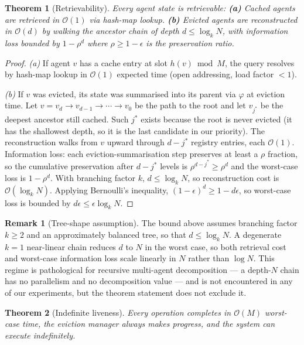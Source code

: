 \documentclass[fleqn,10pt]{article}
\newtheorem{theorem}{Theorem}
\theoremstyle{definition}
\newtheorem{remark}{Remark}
\newcommand{\summarize}{\varphi}
\newcommand{\preserv}{\rho}
\newcommand{\Oh}{\mathcal{O}}
\newcommand{\slots}{M}
\begin{document}
\begin{theorem}[Retrievability]
\label{thm:retrieve}
Every agent state is retrievable:
\textbf{(a)} Cached agents are retrieved in $\Oh(1)$ via hash-map
lookup.
\textbf{(b)} Evicted agents are reconstructed in $\Oh(d)$ by
walking the ancestor chain of depth $d \leq \log_k N$, with
information loss bounded by $1 - \preserv^d$ where $\preserv \geq
1-\epsilon$ is the preservation ratio.
\end{theorem}

\begin{proof}
\emph{(a)} If agent $v$ has a cache entry at slot $h(v) \bmod \slots$,
the query resolves by hash-map lookup in $\Oh(1)$ expected time
(open addressing, load factor $<1$).

\emph{(b)} If $v$ was evicted, its state was summarised into its
parent via $\summarize$ at eviction time. Let
$v = v_d \to v_{d-1} \to \cdots \to v_0$ be the path to the root and
let $v_{j^*}$ be the deepest ancestor still cached. Such $j^*$ exists
because the root is never evicted (it has the shallowest depth, so
it is the last candidate in our priority). The reconstruction walks
from $v$ upward through $d - j^*$ registry entries, each
$\Oh(1)$. Information loss: each eviction-summarisation step
preserves at least a $\preserv$ fraction, so the cumulative
preservation after $d - j^*$ levels is $\preserv^{d-j^*} \geq
\preserv^d$ and the worst-case loss is $1 - \preserv^d$. With
branching factor $k$, $d \leq \log_k N$, so reconstruction cost is
$\Oh(\log_k N)$. Applying Bernoulli's inequality,
$(1-\epsilon)^d \geq 1 - d\epsilon$, so worst-case loss is bounded
by $d\epsilon \leq \epsilon \log_k N$.
\end{proof}

\begin{remark}[Tree-shape assumption]
\label{rem:tree-shape}
The bound above assumes branching factor $k \geq 2$ and an
approximately balanced tree, so that $d \leq \log_k N$. A degenerate
$k = 1$ near-linear chain reduces $d$ to $N$ in the worst case, so
both retrieval cost and worst-case information loss scale linearly in
$N$ rather than $\log N$. This regime is pathological for recursive
multi-agent decomposition --- a depth-$N$ chain has no parallelism and
no decomposition value --- and is not encountered in any of our
experiments, but the theorem statement does not exclude it.
\end{remark}

\begin{theorem}[Indefinite liveness]
\label{thm:liveness}
Every operation completes in $\Oh(\slots)$ worst-case time, the
eviction manager always makes progress, and the system can execute
indefinitely.
\end{theorem}
\end{document}
